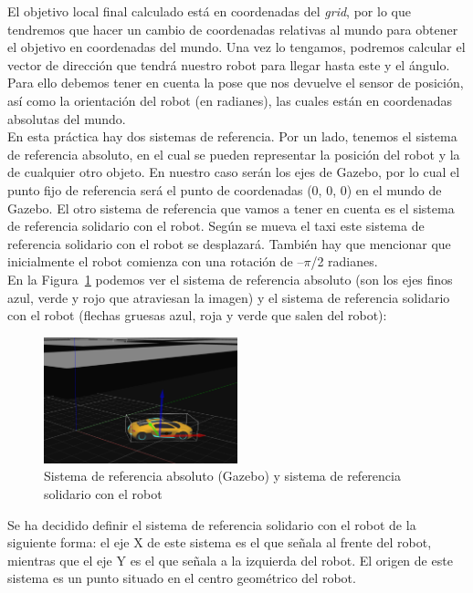 El objetivo local final calculado está en coordenadas del \textit{grid}, por lo que tendremos que hacer un cambio de coordenadas relativas al mundo para obtener el objetivo en coordenadas del mundo. Una vez lo tengamos, podremos calcular el vector de dirección que tendrá nuestro robot para llegar hasta este y el ángulo. Para ello debemos tener en cuenta la pose que nos devuelve el sensor de posición, así como la orientación del robot (en radianes), las cuales están en coordenadas absolutas del mundo.\\

En esta práctica hay dos sistemas de referencia. Por un lado, tenemos el sistema de referencia absoluto, en el cual se pueden representar la posición del robot y la de cualquier otro objeto. En nuestro caso serán los ejes de Gazebo, por lo cual el punto fijo de referencia será el punto de coordenadas (0, 0, 0) en el mundo de Gazebo. El otro sistema de referencia que vamos a tener en cuenta es el sistema de referencia solidario con el robot. Según se mueva el taxi este sistema de referencia solidario con el robot se desplazará. También hay que mencionar que inicialmente el robot comienza con una rotación de –\(\pi\)/2 radianes.\\

En la Figura~\ref{fig.sistemaReferencia_gpp} podemos ver el sistema de referencia absoluto (son los ejes finos azul, verde y rojo que atraviesan la imagen) y el sistema de referencia solidario con el robot (flechas gruesas azul, roja y verde que salen del robot):

\begin{figure}[H]
  \begin{center}
    \includegraphics[width=0.5\textwidth]{figures/GPP/sistemaReferencia_GPP.png}
		\caption{Sistema de referencia absoluto (Gazebo) y sistema de referencia solidario con el robot}
		\label{fig.sistemaReferencia_gpp}
		\end{center}
\end{figure}

Se ha decidido definir el sistema de referencia solidario con el robot de la siguiente forma: el eje X de este sistema es el que señala al frente del robot, mientras que el eje Y es el que señala a la izquierda del robot. El origen de este sistema es un punto situado en el centro geométrico del robot.

